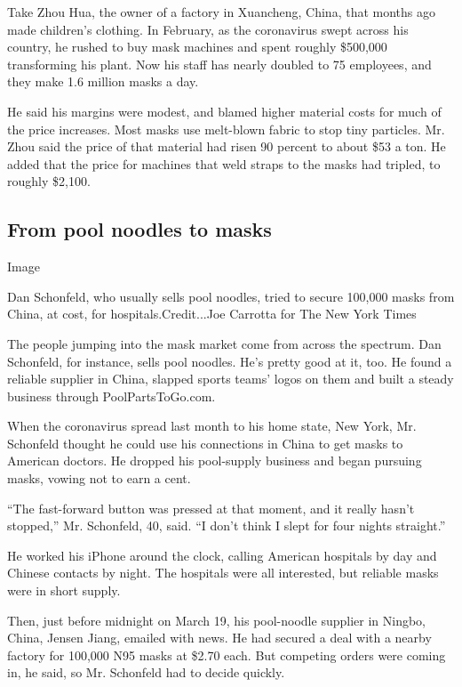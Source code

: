 Take Zhou Hua, the owner of a factory in Xuancheng, China, that months
ago made children's clothing. In February, as the coronavirus swept
across his country, he rushed to buy mask machines and spent roughly
\$500,000 transforming his plant. Now his staff has nearly doubled to 75
employees, and they make 1.6 million masks a day.

He said his margins were modest, and blamed higher material costs for
much of the price increases. Most masks use melt-blown fabric to stop
tiny particles. Mr. Zhou said the price of that material had risen 90
percent to about \$53 a ton. He added that the price for machines that
weld straps to the masks had tripled, to roughly \$2,100.

\hypertarget{from-pool-noodles-to-masks}{%
\subsection{From pool noodles to
masks}\label{from-pool-noodles-to-masks}}

Image

Dan Schonfeld, who usually sells pool noodles, tried to secure 100,000
masks from China, at cost, for hospitals.Credit...Joe Carrotta for The
New York Times

The people jumping into the mask market come from across the spectrum.
Dan Schonfeld, for instance, sells pool noodles. He's pretty good at it,
too. He found a reliable supplier in China, slapped sports teams' logos
on them and built a steady business through PoolPartsToGo.com.

When the coronavirus spread last month to his home state, New York, Mr.
Schonfeld thought he could use his connections in China to get masks to
American doctors. He dropped his pool-supply business and began pursuing
masks, vowing not to earn a cent.

``The fast-forward button was pressed at that moment, and it really
hasn't stopped,'' Mr. Schonfeld, 40, said. ``I don't think I slept for
four nights straight.''

He worked his iPhone around the clock, calling American hospitals by day
and Chinese contacts by night. The hospitals were all interested, but
reliable masks were in short supply.

Then, just before midnight on March 19, his pool-noodle supplier in
Ningbo, China, Jensen Jiang, emailed with news. He had secured a deal
with a nearby factory for 100,000 N95 masks at \$2.70 each. But
competing orders were coming in, he said, so Mr. Schonfeld had to decide
quickly.

